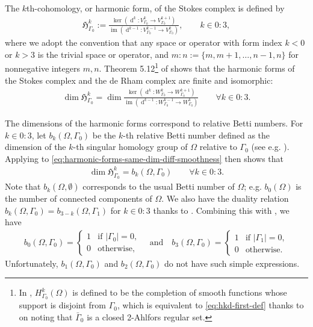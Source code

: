 \documentclass{mcom-l}
\theoremstyle{definition}
\theoremstyle{remark}
\numberwithin{equation}{section}
\newcommand{\harmonic}[1]{\mathfrak{#1}}
\DeclareMathOperator{\dee}{d}
\DeclareMathOperator{\image}{im}
\begin{document}
The $k$th-cohomology, or harmonic form, of the Stokes complex is 
defined by
\begin{align}
	\label{eq:harmonic-forms-bcs}
	\harmonic{H}_{\Gamma_0}^k 
	:= \frac{ \ker(\dee^k : V_{\Gamma_0}^k \to V_{\Gamma_0}^{k+1}) }{ 
		\image(\dee^{k-1} : V_{\Gamma_0}^{k-1} \to V_{\Gamma_0}^k) },
	\qquad k \in 0:3,
\end{align}
where we adopt the convention that any space or operator with form index 
$k < 0$ or $k > 3$ is the trivial space or operator, 
and $m:n := \{ m, m+1,\dots, n-1, n\}$
for nonnegative integers $m, n$. Theorem 5.12\footnote{
	In \cite{PaulySchomburg22}, $H^k_{\Gamma_0}(\Omega)$ is defined to be the 
	completion of smooth functions whose support is disjoint from
	$\Gamma_0$, which is equivalent to \cref{eq:hkd-first-def} thanks to
	\cite[Theorem 8.7 (iv)]{Brewster14} on noting that $\bar{\Gamma}_0$
	is a closed 2-Ahlfors regular set.
} of \cite{PaulySchomburg22}
shows that the harmonic forms of the Stokes complex and the de Rham 
complex are finite and isomorphic:
\begin{align}
	\label{eq:harmonic-forms-same-dim-diff-smoothness}
	\dim \harmonic{H}_{\Gamma_0}^k = 
	\dim \frac{ \ker(\dee^k : W_{\Gamma_0}^k \to W_{\Gamma_0}^{k+1}) }{ 
		\image(\dee^{k-1} : W_{\Gamma_0}^{k-1} \to W_{\Gamma_0}^k) } 
	\qquad \forall k \in 0:3.
\end{align}

The dimensions of the harmonic forms correspond to relative Betti numbers.
For $k \in 0:3$, let $b_k(\Omega, \Gamma_0)$ be the $k$-th relative Betti 
number defined as the dimension of the $k$-th singular homology group of 
$\Omega$ relative to $\Gamma_0$
(see e.g. \cite[pp. 108 \& 115]{Hatcher02}). Applying 
\cite[Theorem 5.3 and eq. (5.28)]{GoldshteinMitreaMitrea11}
to \cref{eq:harmonic-forms-same-dim-diff-smoothness} 
then shows that 
\begin{align}
	\label{eq:harmonic-forms-dim}
	\dim \harmonic{H}_{\Gamma_0}^k = b_k(\Omega, \Gamma_0) \qquad \forall k \in 0:3.
\end{align}
Note that $b_k(\Omega, \emptyset)$ corresponds to the usual Betti number 
of $\Omega$; e.g. $b_0(\Omega)$ is the number of connected components 
of $\Omega$. We also have the duality relation 
$b_{k}(\Omega, \Gamma_0) = b_{3-k}(\Omega, \Gamma_1)$ for $k \in 0:3$
thanks to \cite[Corollary 5.4]{GoldshteinMitreaMitrea11}. Combining this 
with \cite[eq. (5.10)]{GoldshteinMitreaMitrea11}, we have 
\begin{align*}
	b_0(\Omega, \Gamma_0) = \begin{cases}
		1 & \text{if } |\Gamma_0| = 0, \\
		0 & \text{otherwise},
	\end{cases}
	\quad \text{and} \quad 
	b_3(\Omega, \Gamma_0) = \begin{cases}
		1 & \text{if } |\Gamma_1| = 0, \\
		0 & \text{otherwise}.
	\end{cases}
\end{align*}
Unfortunately, $b_{1}(\Omega, \Gamma_0)$ and $b_2(\Omega, \Gamma_0)$ do not 
have such simple expressions.
\end{document}
